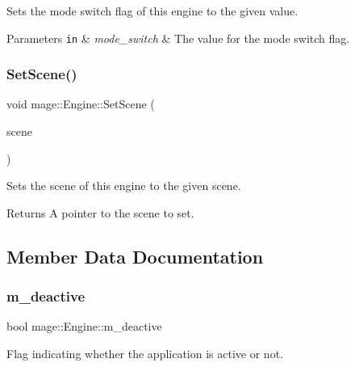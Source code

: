 Sets the mode switch flag of this engine to the given value.


\begin{DoxyParams}[1]{Parameters}
\mbox{\tt in}  & {\em mode\+\_\+switch} & The value for the mode switch flag. \\
\hline
\end{DoxyParams}
\hypertarget{classmage_1_1_engine_aec75ed67f8fb68a383fa892e50b21ea7}{}\label{classmage_1_1_engine_aec75ed67f8fb68a383fa892e50b21ea7} 
\subsubsection{\texorpdfstring{Set\+Scene()}{SetScene()}}
{\footnotesize\ttfamily void mage\+::\+Engine\+::\+Set\+Scene (\begin{DoxyParamCaption}\item[{\hyperlink{namespacemage_a1e01ae66713838a7a67d30e44c67703e}{Shared\+Ptr}$<$ \hyperlink{classmage_1_1_scene}{Scene} $>$}]{scene }\end{DoxyParamCaption})}

Sets the scene of this engine to the given scene.

\begin{DoxyReturn}{Returns}
A pointer to the scene to set. 
\end{DoxyReturn}


\subsection{Member Data Documentation}
\hypertarget{classmage_1_1_engine_ab8a4b0157403708ae7d1d018a95b4c63}{}\label{classmage_1_1_engine_ab8a4b0157403708ae7d1d018a95b4c63} 
\subsubsection{\texorpdfstring{m\+\_\+deactive}{m\_deactive}}
{\footnotesize\ttfamily bool mage\+::\+Engine\+::m\+\_\+deactive\hspace{0.3cm}{\ttfamily [private]}}

Flag indicating whether the application is active or not. \hypertarget{classmage_1_1_engine_a8e9048208a6a5c5b034aaa1cbdab28bc}{}\label{classmage_1_1_engine_a8e9048208a6a5c5b034aaa1cbdab28bc} 
